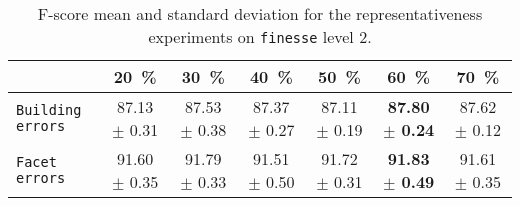         \begin{table}
            \footnotesize
            \centering
            \begin{tabular}{x{2cm} c c c c c c}
                \toprule
                & \textbf{\SI{20}{\percent}} & \textbf{\SI{30}{\percent}} & \textbf{\SI{40}{\percent}} & \textbf{\SI{50}{\percent}} & \textbf{\SI{60}{\percent}} & \textbf{\SI{70}{\percent}}\\
                \midrule
                \texttt{Building errors} & 87.13 $\pm$ 0.31 & 87.53 $\pm$ 0.38 & 87.37 $\pm$ 0.27 & 87.11 $\pm$ 0.19 & \textbf{87.80 $\pm$ 0.24} & 87.62 $\pm$ 0.12 \\
                \midrule
                \texttt{Facet errors} & 91.60 $\pm$ 0.35 & 91.79 $\pm$ 0.33 & 91.51 $\pm$ 0.50 & 91.72 $\pm$ 0.31 & \textbf{91.83 $\pm$ 0.49} & 91.61 $\pm$ 0.35 \\
                \bottomrule
            \end{tabular}
            \caption{\label{tab::f_score_representativeness_f2} F-score mean and standard deviation for the representativeness experiments on \texttt{finesse} level 2.}
        \end{table}
    
